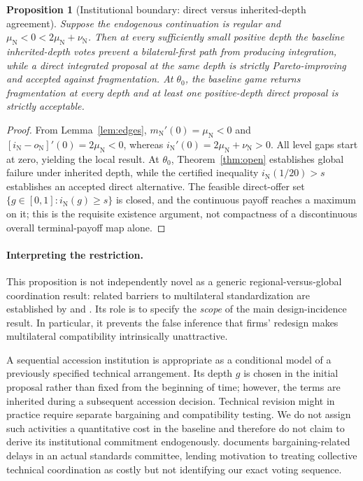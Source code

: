 \documentclass[11pt,a4paper]{article}
\newtheorem{proposition}[theorem]{Proposition}
\theoremstyle{remark}\newtheorem{remark}[theorem]{Remark}
\newcommand{\N}{\mathrm{N}}\newcommand{\F}{\mathrm{F}}
\begin{document}
\begin{proposition}[Institutional boundary: direct versus inherited-depth agreement]\label{prop:direct}
Suppose the endogenous continuation is regular and $\mu_{\N}<0<2\mu_{\N}+\nu_{\N}$. Then at every sufficiently small positive depth the baseline inherited-depth votes prevent a bilateral-first path from producing integration, while a \emph{direct} integrated proposal at the same depth is strictly Pareto-improving and accepted against fragmentation. At $\theta_0$, the baseline game returns fragmentation at every depth and at least one positive-depth direct proposal is strictly acceptable.
\end{proposition}
\begin{proof}
From Lemma~\ref{lem:edges}, $m_{\N}'(0)=\mu_{\N}<0$ and $[i_{\N}-o_{\N}]'(0)=2\mu_{\N}<0$, whereas $i_{\N}'(0)=2\mu_{\N}+\nu_{\N}>0$. All level gaps start at zero, yielding the local result. At $\theta_0$, Theorem~\ref{thm:open} establishes global failure under inherited depth, while the certified inequality $i_{\N}(1/20)>s$ establishes an accepted direct alternative. The feasible direct-offer set $\{g\in[0,1]:i_{\N}(g)\ge s\}$ is closed, and the continuous payoff reaches a maximum on it; this is the requisite existence argument, not compactness of a discontinuous overall terminal-payoff map alone.
\end{proof}

\paragraph{Interpreting the restriction.}
This proposition is not independently novel as a generic regional-versus-global coordination result: related barriers to multilateral standardization are established by \citet{Takarada2020} and \citet{Kawabata2021}. Its role is to specify the \emph{scope} of the main design-incidence result. In particular, it prevents the false inference that firms' redesign makes multilateral compatibility intrinsically unattractive.

A sequential accession institution is appropriate as a conditional model of a previously specified technical arrangement. Its depth $g$ is chosen in the initial proposal rather than fixed from the beginning of time; however, the terms are inherited during a subsequent accession decision. Technical revision might in practice require separate bargaining and compatibility testing. We do not assign such activities a quantitative cost in the baseline and therefore do not claim to derive its institutional commitment endogenously. \citet{Simcoe2012} documents bargaining-related delays in an actual standards committee, lending motivation to treating collective technical coordination as costly but not identifying our exact voting sequence.
\end{document}
